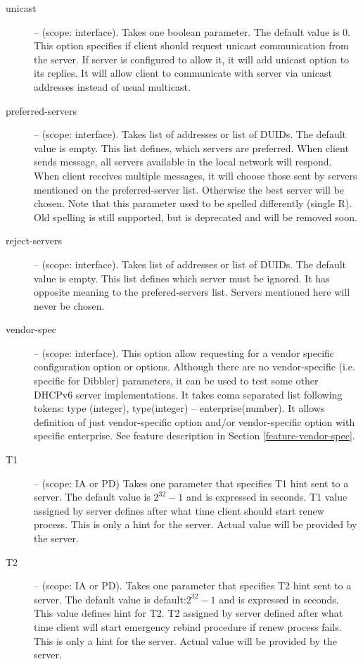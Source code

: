 \begin{description}
 \item[unicast] -- (scope: interface). Takes one boolean
  parameter. The default value is 0. This option specifies if client
  should request unicast communication from the server. If server is
  configured to allow it, it will add unicast option to its
  replies. It will allow client to communicate with server via unicast
  addresses instead of usual multicast.

 \item[preferred-servers] -- (scope: interface). Takes list of
  addresses or list of DUIDs. The default value is empty.  This list
  defines, which servers are preferred. When client sends 
  message, all servers available in the local network will
  respond. When client receives multiple  messages, it
  will choose those sent by servers mentioned on the preferred-server
  list. Otherwise the best server will be chosen. Note that this
  parameter used to be spelled differently (single R). Old spelling
  is still supported, but is deprecated and will be removed soon.

 \item[reject-servers] -- (scope: interface). Takes list of addresses
  or list of DUIDs. The default value is empty. This list defines
  which server must be ignored. It has opposite meaning to the
  prefered-servers list. Servers mentioned here will never be chosen.

 \item[vendor-spec] -- (scope: interface). This option allow
   requesting for a vendor specific configuration option or
   options. Although there are no vendor-specific (i.e. specific for
   Dibbler) parameters, it can be used to test some other DHCPv6
   server implementations. It takes coma separated list following
   tokens: type (integer), type(integer) -- enterprise(number). It
   allows definition of just vendor-specific option and/or
   vendor-specific option with specific enterprise. See feature
   description in Section \ref{feature-vendor-spec}.

 \item[T1] -- (scope: IA or PD) Takes one parameter that specifies T1
   hint sent to a server. The default value is $2^{32}-1$ and is
   expressed in seconds. T1 value assigned by server defines after
   what time client should start renew process. This is only a hint
   for the server. Actual value will be provided by the server.

\item[T2] -- (scope: IA or PD). Takes one parameter that specifies T2 hint
   sent to a server. The default value is default:$2^{32}-1$ and is
   expressed in seconds. This value defines hint for T2. T2 assigned
   by server defined after what time client will start emergency
   rebind procedure if renew process fails. This is only a hint for
   the server. Actual value will be provided by the server.


\end{description}

